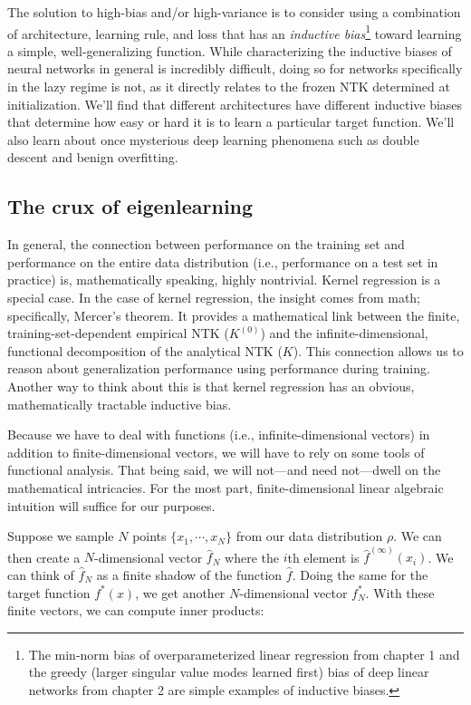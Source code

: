 \bigskip
The solution to high-bias and/or high-variance is to consider
using a combination of architecture, learning rule, and loss
that has an \textit{inductive bias}\footnote{
    The min-norm bias of overparameterized linear regression from chapter 1 and
    the greedy (larger singular value modes learned first) bias of deep linear networks from chapter 2
    are simple examples of inductive biases.
}
toward learning a simple, well-generalizing function. While characterizing the inductive biases
of neural networks in general is incredibly difficult, doing so for networks specifically in the lazy regime
is not, as it directly relates to the frozen NTK determined at initialization.
We'll find that different architectures have different inductive biases that
determine how easy or hard it is to learn a particular target function.
We'll also learn about once mysterious deep learning phenomena such as double descent
and benign overfitting.

\subsection{The crux of eigenlearning}

In general, the connection between performance on the training set and performance on the entire data distribution (i.e., performance on a test set in practice) is, mathematically speaking, highly nontrivial. Kernel regression is a special case. In the case of kernel regression, the insight comes from math; specifically, Mercer's theorem. It provides a mathematical link between the finite, training-set-dependent empirical NTK ($K^{(0)}$) and the infinite-dimensional, functional decomposition of the analytical NTK ($K$). This connection allows us to reason about generalization performance using performance during training. Another way to think about this is that kernel regression has an obvious, mathematically tractable inductive bias.

Because we have to deal with functions (i.e., infinite-dimensional vectors) in addition to finite-dimensional vectors, we will have to rely on some tools of functional analysis. That being said, we will not---and need not---dwell on the mathematical intricacies. For the most part, finite-dimensional linear algebraic intuition will suffice for our purposes.

Suppose we sample $N$ points $\{x_1,\cdots,x_N\}$ from our data distribution $\rho$. We can then create a $N$-dimensional vector $\hat{f}_N$ where the $i$th element is ${\hat{f}}^{(\infty)}(x_i)$. We can think of $\hat{f}_N$ as a finite shadow of the function $\hat{f}$. Doing the same for the target function $f^*(x)$, we get another $N$-dimensional vector $f^*_N$. With these finite vectors, we can compute inner products:


